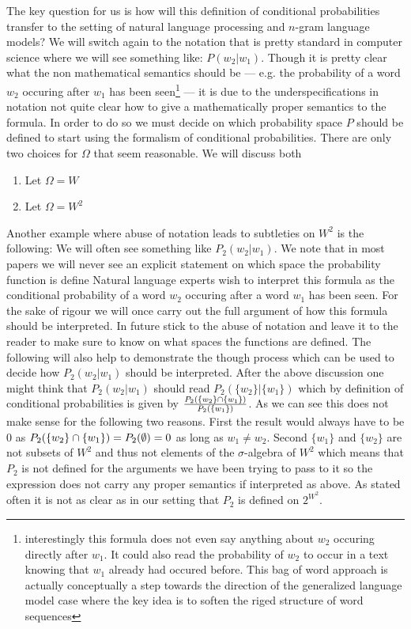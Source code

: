 \documentclass[•]{book}
\begin{document}
The key question for us is how will this definition of conditional probabilities transfer to the setting of natural language processing and $n$-gram language models?
We will switch again to the notation that is pretty standard in computer science  where we will see something like: $P(w_2|w_1)$.
Though it is pretty clear what the non mathematical semantics should be --- e.g. the probability of a word $w_2$ occuring after $w_1$ has been seen\footnote{interestingly this formula does not even say anything about $w_2$ occuring directly after $w_1$. It could also read the probability of $w_2$ to occur in a text knowing that $w_1$ already had occured before. This bag of word approach is actually conceptually a step towards the direction of the generalized language model case where the key idea is to soften the riged structure of word sequences} --- it is due to the underspecifications in notation not quite clear how to give a mathematically proper semantics to the formula.
In order to do so we must decide on which probability space $P$ should be defined to start using the formalism of conditional probabilities.
There are only two choices for $\Omega$ that seem reasonable. We will discuss both
\begin{enumerate}
\item Let $\Omega=W$ 
\item Let $\Omega=W^2$
\end{enumerate}


Another example where abuse of notation leads to subtleties on $W^2$ is the following: 
We will often see something like $P_2(w_2|w_1)$. We note that in most papers we will never see an explicit statement on which space the probability function is define
Natural language experts wish to interpret this formula as the conditional probability of a word $w_2$ occuring after a word $w_1$ has been seen.
For the sake of rigour we will once carry out the full argument of how this formula should be interpreted.
In future stick to the abuse of notation and leave it to the reader to make sure to know on what spaces the functions are defined. 
The following will also help to demonstrate the though process which can be used to decide how $P_2(w_2|w_1)$ should be interpreted.
After the above discussion one might think that $P_2(w_2|w_1)$ should read $P_2(\{w_2\}|\{w_1\})$ which by definition of conditional probabilities is given by $\frac{P_2(\{w_2\}\cap \{w_1\})}{P_2(\{w_1\})}$.
As we can see this does not make sense for the following two reasons.
First the result would always have to be $0$ as $P_2(\{w_2\}\cap \{w_1\}) = P_2(\emptyset) = 0$ as long as $w_1\neq w_2$.
Second $\{w_1\}$ and $\{w_2\}$ are not subsets of $W^2$ and thus not elements of the $\sigma$-algebra of $W^2$ which means that $P_2$ is not defined for the arguments we have been trying to pass to it so the expression does not carry any proper semantics if interpreted as above. 
As stated often it is not as clear as in our setting that $P_2$ is defined on $2^{W^2}$.
\end{document}
